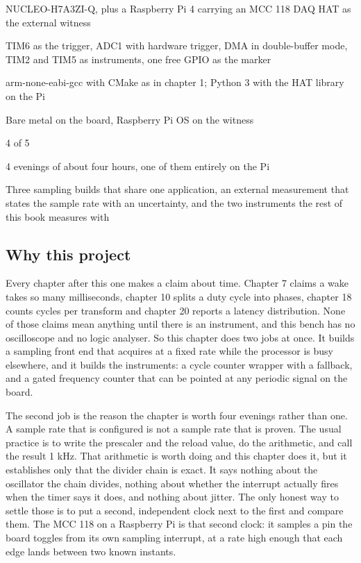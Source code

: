 
\begin{keyfacts}
\item[Board] NUCLEO-H7A3ZI-Q, plus a Raspberry Pi 4 carrying an MCC 118 DAQ HAT as the external witness
\item[Peripherals] TIM6 as the trigger, ADC1 with hardware trigger, DMA in double-buffer mode, TIM2 and TIM5 as instruments, one free GPIO as the marker
\item[Toolchain] arm-none-eabi-gcc with CMake as in chapter 1; Python 3 with the HAT library on the Pi
\item[Operating system] Bare metal on the board, Raspberry Pi OS on the witness
\item[Difficulty] 4 of 5
\item[Effort] 4 evenings of about four hours, one of them entirely on the Pi
\item[Deliverable] Three sampling builds that share one application, an external measurement that states the sample rate with an uncertainty, and the two instruments the rest of this book measures with
\end{keyfacts}

\subsection*{Why this project}

Every chapter after this one makes a claim about time. Chapter 7 claims a wake
takes so many milliseconds, chapter 10 splits a duty cycle into phases, chapter
18 counts cycles per transform and chapter 20 reports a latency distribution.
None of those claims mean anything until there is an instrument, and this bench
has no oscilloscope and no logic analyser. So this chapter does two jobs at
once. It builds a sampling front end that acquires at a fixed rate while the
processor is busy elsewhere, and it builds the instruments: a cycle counter
wrapper with a fallback, and a gated frequency counter that can be pointed at
any periodic signal on the board.

The second job is the reason the chapter is worth four evenings rather than
one. A sample rate that is configured is not a sample rate that is proven. The
usual practice is to write the prescaler and the reload value, do the
arithmetic, and call the result 1 kHz. That arithmetic is worth doing and this
chapter does it, but it establishes only that the divider chain is exact. It
says nothing about the oscillator the chain divides, nothing about whether the
interrupt actually fires when the timer says it does, and nothing about jitter.
The only honest way to settle those is to put a second, independent clock next
to the first and compare them. The MCC 118 on a Raspberry Pi is that second
clock: it samples a pin the board toggles from its own sampling interrupt, at a
rate high enough that each edge lands between two known instants.

